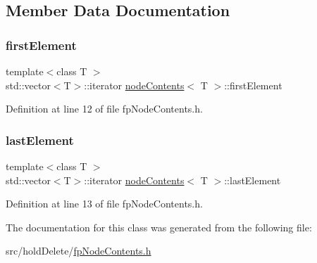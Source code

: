\subsection{Member Data Documentation}
\mbox{\label{classnodeContents_ae9259755596d9e4542ad73605112569f}} 
\subsubsection{\texorpdfstring{first\+Element}{firstElement}}
{\footnotesize\ttfamily template$<$class T $>$ \\
std\+::vector$<$T$>$\+::iterator \hyperlink{classnodeContents}{node\+Contents}$<$ T $>$\+::first\+Element\hspace{0.3cm}{\ttfamily [private]}}



Definition at line 12 of file fp\+Node\+Contents.\+h.

\mbox{\label{classnodeContents_addfed5d7004d0d126856cd5907e11ff3}} 
\subsubsection{\texorpdfstring{last\+Element}{lastElement}}
{\footnotesize\ttfamily template$<$class T $>$ \\
std\+::vector$<$T$>$\+::iterator \hyperlink{classnodeContents}{node\+Contents}$<$ T $>$\+::last\+Element\hspace{0.3cm}{\ttfamily [private]}}



Definition at line 13 of file fp\+Node\+Contents.\+h.



The documentation for this class was generated from the following file\+:\begin{DoxyCompactItemize}
\item 
src/hold\+Delete/\hyperlink{fpNodeContents_8h}{fp\+Node\+Contents.\+h}\end{DoxyCompactItemize}
